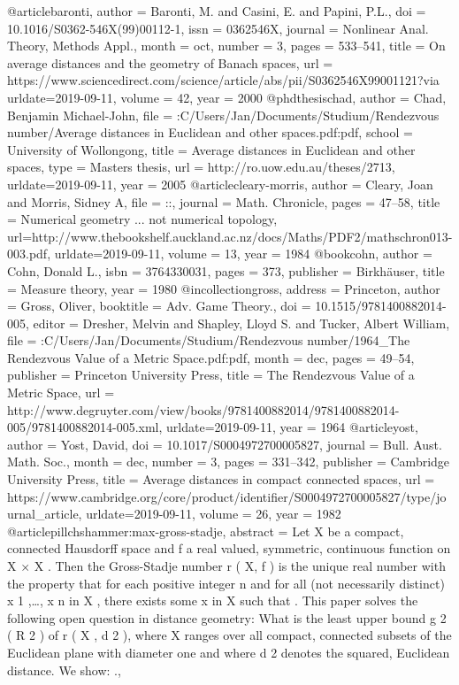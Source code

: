 @article{baronti,
author = {Baronti, M. and Casini, E. and Papini, P.L.},
doi = {10.1016/S0362-546X(99)00112-1},
issn = {0362546X},
journal = {Nonlinear Anal. Theory, Methods Appl.},
month = {oct},
number = {3},
pages = {533--541},
title = {{On average distances and the geometry of Banach spaces}},
url = {https://www.sciencedirect.com/science/article/abs/pii/S0362546X99001121?via%
urldate={2019-09-11},
volume = {42},
year = {2000}
}
@phdthesis{chad,
author = {Chad, Benjamin Michael-John},
file = {:C\:/Users/Jan/Documents/Studium/Rendezvous number/Average distances in Euclidean and other spaces.pdf:pdf},
school = {University of Wollongong},
title = {{Average distances in Euclidean and other spaces}},
type = {Masters thesis},
url = {http://ro.uow.edu.au/theses/2713},
urldate={2019-09-11},
year = {2005}
}
@article{cleary-morris,
author = {Cleary, Joan and Morris, Sidney A},
file = {::},
journal = {Math. Chronicle},
pages = {47--58},
title = {{Numerical geometry ... not numerical topology}},
url={http://www.thebookshelf.auckland.ac.nz/docs/Maths/PDF2/mathschron013-003.pdf},
urldate={2019-09-11},
volume = {13},
year = {1984}
}
@book{cohn,
author = {Cohn, Donald L.},
isbn = {3764330031},
pages = {373},
publisher = {Birkhäuser},
title = {{Measure theory}},
year = {1980}
}
@incollection{gross,
address = {Princeton},
author = {Gross, Oliver},
booktitle = {Adv. Game Theory.},
doi = {10.1515/9781400882014-005},
editor = {Dresher, Melvin and Shapley, Lloyd S. and Tucker, Albert William},
file = {:C\:/Users/Jan/Documents/Studium/Rendezvous number/1964_The Rendezvous Value of a Metric Space.pdf:pdf},
month = {dec},
pages = {49--54},
publisher = {Princeton University Press},
title = {{The Rendezvous Value of a Metric Space}},
url = {http://www.degruyter.com/view/books/9781400882014/9781400882014-005/9781400882014-005.xml},
urldate={2019-09-11},
year = {1964}
}
@article{yost,
author = {Yost, David},
doi = {10.1017/S0004972700005827},
journal = {Bull. Aust. Math. Soc.},
month = {dec},
number = {3},
pages = {331--342},
publisher = {Cambridge University Press},
title = {{Average distances in compact connected spaces}},
url = {https://www.cambridge.org/core/product/identifier/S0004972700005827/type/journal_article},
urldate={2019-09-11},
volume = {26},
year = {1982}
}
@article{pillchshammer:max-gross-stadje,
abstract = {Let X be a compact, connected Hausdorff space and f a real valued, symmetric, continuous function on X × X . Then the Gross-Stadje number r ( X, f ) is the unique real number with the property that for each positive integer n and for all (not necessarily distinct) x 1 ,{\ldots}, x n in X , there exists some x in X such that . This paper solves the following open question in distance geometry: What is the least upper bound g 2 ( R 2 ) of r ( X , d 2 ), where X ranges over all compact, connected subsets of the Euclidean plane with diameter one and where d 2 denotes the squared, Euclidean distance. We show: .},
}}
